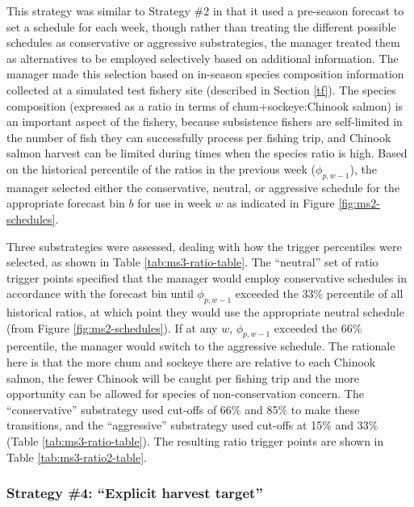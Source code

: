 \documentclass[12pt,]{book}
\theoremstyle{definition}
\theoremstyle{definition}
\theoremstyle{definition}
\theoremstyle{remark}
\begin{document}
\noindent
This strategy was similar to Strategy \#2 in that it used a pre-season
forecast to set a schedule for each week, though rather than treating
the different possible schedules as conservative or aggressive
substrategies, the manager treated them as alternatives to be employed
selectively based on additional information. The manager made this
selection based on in-season species composition information collected
at a simulated test fishery site (described in Section \ref{tf}). The
species composition (expressed as a ratio in terms of
chum+sockeye:Chinook salmon) is an important aspect of the fishery,
because subsistence fishers are self-limited in the number of fish they
can successfully process per fishing trip, and Chinook salmon harvest
can be limited during times when the species ratio is high. Based on the
historical percentile of the ratios in the previous week
(\(\phi_{p,w-1}\)), the manager selected either the conservative,
neutral, or aggressive schedule for the appropriate forecast bin \(b\)
for use in week \(w\) as indicated in Figure \ref{fig:ms2-schedules}.

Three substrategies were assessed, dealing with how the trigger
percentiles were selected, as shown in Table \ref{tab:ms3-ratio-table}.
The ``neutral'' set of ratio trigger points specified that the manager
would employ conservative schedules in accordance with the forecast bin
until \(\phi_{p,w-1}\) exceeded the 33\% percentile of all historical
ratios, at which point they would use the appropriate neutral schedule
(from Figure \ref{fig:ms2-schedules}). If at any \(w\), \(\phi_{p,w-1}\)
exceeded the 66\% percentile, the manager would switch to the aggressive
schedule. The rationale here is that the more chum and sockeye there are
relative to each Chinook salmon, the fewer Chinook will be caught per
fishing trip and the more opportunity can be allowed for species of
non-conservation concern. The ``conservative'' substrategy used cut-offs
of 66\% and 85\% to make these transitions, and the ``aggressive''
substrategy used cut-offs at 15\% and 33\% (Table
\ref{tab:ms3-ratio-table}). The resulting ratio trigger points are shown
in Table \ref{tab:ms3-ratio2-table}.

\subsubsection{\texorpdfstring{Strategy \#4: ``Explicit harvest
target''}{Strategy \#4: Explicit harvest target}}\label{strategy-4-explicit-harvest-target}
\end{document}
